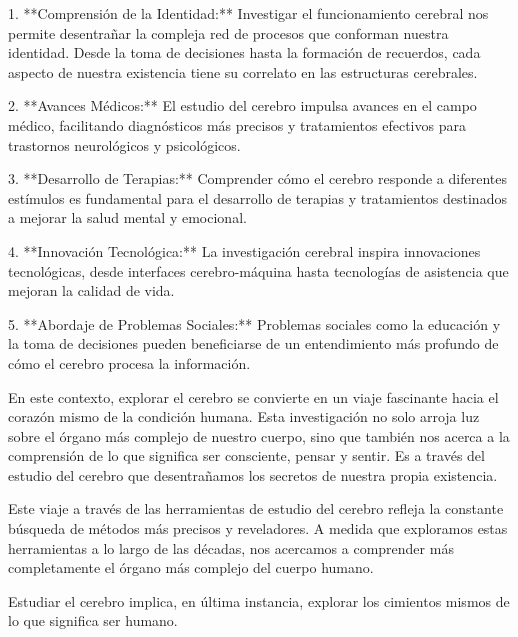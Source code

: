 \documentclass{article}
\begin{document}
	1. **Comprensión de la Identidad:** Investigar el funcionamiento cerebral nos permite desentrañar la compleja red de procesos que conforman nuestra identidad. Desde la toma de decisiones hasta la formación de recuerdos, cada aspecto de nuestra existencia tiene su correlato en las estructuras cerebrales.
	
	2. **Avances Médicos:** El estudio del cerebro impulsa avances en el campo médico, facilitando diagnósticos más precisos y tratamientos efectivos para trastornos neurológicos y psicológicos.
	
	3. **Desarrollo de Terapias:** Comprender cómo el cerebro responde a diferentes estímulos es fundamental para el desarrollo de terapias y tratamientos destinados a mejorar la salud mental y emocional.
	
	4. **Innovación Tecnológica:** La investigación cerebral inspira innovaciones tecnológicas, desde interfaces cerebro-máquina hasta tecnologías de asistencia que mejoran la calidad de vida.
	
	5. **Abordaje de Problemas Sociales:** Problemas sociales como la educación y la toma de decisiones pueden beneficiarse de un entendimiento más profundo de cómo el cerebro procesa la información.
	
	En este contexto, explorar el cerebro se convierte en un viaje fascinante hacia el corazón mismo de la condición humana. Esta investigación no solo arroja luz sobre el órgano más complejo de nuestro cuerpo, sino que también nos acerca a la comprensión de lo que significa ser consciente, pensar y sentir. Es a través del estudio del cerebro que desentrañamos los secretos de nuestra propia existencia.
	
	
	
	
	
	Este viaje a través de las herramientas de estudio del cerebro refleja la constante búsqueda de métodos más precisos y reveladores. A medida que exploramos estas herramientas a lo largo de las décadas, nos acercamos a comprender más completamente el órgano más complejo del cuerpo humano.
	
	Estudiar el cerebro implica, en última instancia, explorar los cimientos mismos de lo que significa ser humano.
	
\end{document}
